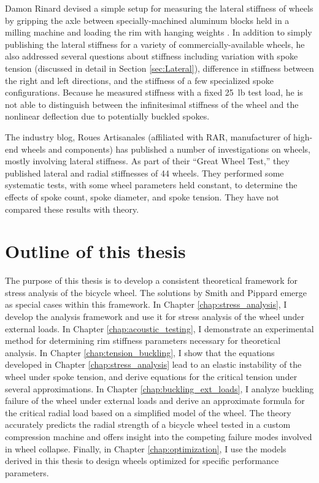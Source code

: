 \documentclass[../thesis.tex]{subfiles}
\begin{document}
Damon Rinard devised a simple setup for measuring the lateral stiffness of wheels by gripping the axle between specially-machined aluminum blocks held in a milling machine and loading the rim with hanging weights \cite{Rinard}. In addition to simply publishing the lateral stiffness for a variety of commercially-available wheels, he also addressed several questions about stiffness including variation with spoke tension (discussed in detail in Section \ref{sec:Lateral}), difference in stiffness between the right and left directions, and the stiffness of a few specialized spoke configurations. Because he measured stiffness with a fixed \SI{25}{lb} test load, he is not able to distinguish between the infinitesimal stiffness of the wheel and the nonlinear deflection due to potentially buckled spokes.

The industry blog, Roues Artisanales \cite{RARblog} (affiliated with RAR, manufacturer of high-end wheels and components) has published a number of investigations on wheels, mostly involving lateral stiffness. As part of their ``Great Wheel Test,'' they published lateral and radial stiffnesses of 44 wheels. They performed some systematic tests, with some wheel parameters held constant, to determine the effects of spoke count, spoke diameter, and spoke tension. They have not compared these results with theory.

\section{Outline of this thesis}

The purpose of this thesis is to develop a consistent theoretical framework for stress analysis of the bicycle wheel. The solutions by Smith and Pippard emerge as special cases within this framework. In Chapter \ref{chap:stress_analysis}, I develop the analysis framework and use it for stress analysis of the wheel under external loads. In Chapter \ref{chap:acoustic_testing}, I demonstrate an experimental method for determining rim stiffness parameters necessary for theoretical analysis. In Chapter \ref{chap:tension_buckling}, I show that the equations developed in Chapter \ref{chap:stress_analysis} lead to an elastic instability of the wheel under spoke tension, and derive equations for the critical tension under several approximations. In Chapter \ref{chap:buckling_ext_loads}, I analyze buckling failure of the wheel under external loads and derive an approximate formula for the critical radial load based on a simplified model of the wheel. The theory accurately predicts the radial strength of a bicycle wheel tested in a custom compression machine and offers insight into the competing failure modes involved in wheel collapse. Finally, in Chapter \ref{chap:optimization}, I use the models derived in this thesis to design wheels optimized for specific performance parameters.
\end{document}
